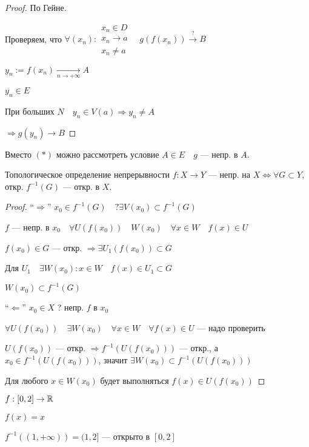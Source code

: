     \begin{proof}
        По Гейне.

        Проверяем, что $\forall (x_n): \substack{x_n\in D \\ x_n\to a \\ x_n\not=a} \quad g(f(x_n))\xrightarrow{?} B$

        $y_n:=f(x_n)\xrightarrow[n\to+\infty]{} A$

        $y_n\in E$

        При больших $N\quad y_n\in V(a) \Rightarrow y_n\not=A$

        $\Rightarrow g(y_n)\to B$
    \end{proof}
    \begin{remark}
        Вместо $(*)$ можно рассмотреть условие $A\in E \quad g$ --- непр. в $A$.
    \end{remark}
    \begin{theorem}
        Топологическое определение непрерывности
        $f: X\to Y$ --- непр. на $X \Leftrightarrow \forall G\subset Y$, откр. $f^{-1}(G)$ --- откр. в $X$.
    \end{theorem}
    \begin{proof}
        ``$\Rightarrow$'' $x_0\in f^{-1}(G) \quad ?\exists V(x_0)\subset f^{-1}(G)$

        $f$ --- непр. в $x_0 \quad \forall U(f(x_0)) \quad W(x_0) \quad \forall x\in W \quad f(x)\in U$

        $f(x_0)\in G$ --- откр. $\Rightarrow \exists U_1(f(x_0))\subset G$

        Для $U_1 \quad \exists W(x_0):x\in W \quad f(x)\in U_1\subset G$

        $W(x_0)\subset f^{-1}(G)$

        ``$\Leftarrow$'' $x_0\in X$ ? непр. $f$ в $x_0$

        $\forall U(f(x_0)) \quad \exists W(x_0) \quad \forall x\in W \quad \forall f(x)\in U$ --- надо проверить

        $U(f(x_0))$ --- откр. $\Rightarrow f^{-1}(U(f(x_0)))$ --- откр., а $x_0\in f^{-1}(U(f(x_0)))$, значит $\exists W(x_0) \subset f^{-1}(U(f(x_0)))$

        Для любого $x\in W(x_0)$ будет выполняться $f(x)\in U(f(x_0))$
    \end{proof}
    \begin{remark}
        $f:[0, 2]\to\operatorname*{\mathbb{R}}$

        $f(x)=x$

        $f^{-1}((1, +\infty))=(1, 2]$ --- открыто в $[0, 2]$
    \end{remark}
